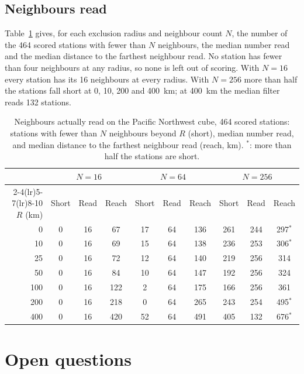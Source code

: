 \documentclass[preprint,12pt,authoryear]{elsarticle}
\begin{document}
\subsection{Neighbours read}
\label{sec:res-neighbours}

Table~\ref{tab:neighbours} gives, for each exclusion radius and neighbour count $N$, the number of the 464 scored stations with fewer than $N$ neighbours, the median number read and the median distance to the farthest neighbour read. No station has fewer than four neighbours at any radius, so none is left out of scoring. With $N = 16$ every station has its 16 neighbours at every radius. With $N = 256$ more than half the stations fall short at 0, 10, 200 and 400~km; at 400~km the median filter reads 132 stations.

\begin{table}[tbp]
  \centering
  \footnotesize
  \caption{Neighbours actually read on the Pacific Northwest cube, 464 scored stations: stations with fewer than $N$ neighbours beyond $R$ (short), median number read, and median distance to the farthest neighbour read (reach, km). $^\ast$: more than half the stations are short.}
  \label{tab:neighbours}
  \begin{tabular}{rccccccccc}
    \toprule
    & \multicolumn{3}{c}{$N = 16$} & \multicolumn{3}{c}{$N = 64$} & \multicolumn{3}{c}{$N = 256$} \\
    \cmidrule(lr){2-4}\cmidrule(lr){5-7}\cmidrule(lr){8-10}
    $R$ (km) & Short & Read & Reach & Short & Read & Reach & Short & Read & Reach \\
    \midrule
    0 & 0 & 16 & 67 & 17 & 64 & 136 & 261 & 244 & 297$^\ast$ \\
    10 & 0 & 16 & 69 & 15 & 64 & 138 & 236 & 253 & 306$^\ast$ \\
    25 & 0 & 16 & 72 & 12 & 64 & 140 & 219 & 256 & 314 \\
    50 & 0 & 16 & 84 & 10 & 64 & 147 & 192 & 256 & 324 \\
    100 & 0 & 16 & 122 & 2 & 64 & 175 & 166 & 256 & 361 \\
    200 & 0 & 16 & 218 & 0 & 64 & 265 & 243 & 254 & 495$^\ast$ \\
    400 & 0 & 16 & 420 & 52 & 64 & 491 & 405 & 132 & 676$^\ast$ \\
    \bottomrule
  \end{tabular}
\end{table}

\section{Open questions}
\label{sec:open}
\end{document}
